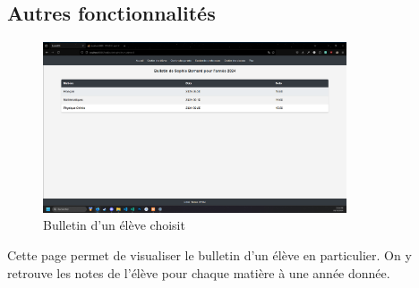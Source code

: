 \documentclass[a4paper,12pt]{article}
\begin{document}
\subsection{Autres fonctionnalités}

\begin{figure}[H]
    \centering
    \includegraphics[width=0.8\textwidth]{imgSite/bulletin.png}
    \caption{Bulletin d'un élève choisit}
\end{figure}

Cette page permet de visualiser le bulletin d'un élève en particulier. On y retrouve les notes de l'élève pour chaque matière à une année donnée. 
\end{document}
